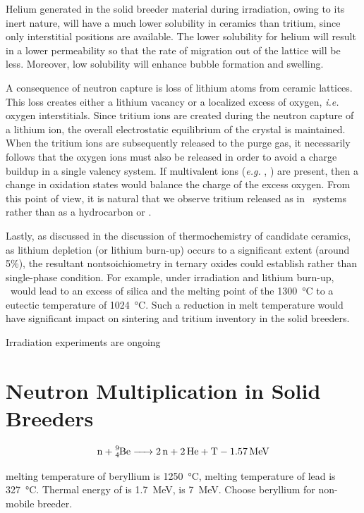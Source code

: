 \documentclass[11pt]{report} %
\newcommand{\lis}{\ce{Li4SiO4}}
\newcommand{\lio}{\ce{Li2O}}
\begin{document}
Helium generated in the solid breeder material during irradiation, owing to its inert nature, will have a much lower solubility in ceramics than tritium, since only interstitial positions are available. The lower solubility for helium will result in a lower permeability so that the rate of migration out of the lattice will be less. Moreover, low solubility will enhance bubble formation and swelling.

A consequence of neutron capture is loss of lithium atoms from ceramic lattices. This loss creates either a lithium vacancy or a localized excess of oxygen, \textit{i.e.} oxygen interstitials. Since tritium ions are created during the neutron capture of a lithium ion, the overall electrostatic equilibrium of the crystal is maintained. When the tritium ions are subsequently released to the purge gas, it necessarily follows that the oxygen ions must also be released in order to avoid a charge buildup in a single valency system. If multivalent ions (\textit{e.g.} , ) are present, then a change in oxidation states would balance the charge of the excess oxygen. From this point of view, it is natural that we observe tritium released as  in \lio~systems rather than as a hydrocarbon or .\cite{Johnson1981}

Lastly, as discussed in the discussion of thermochemistry of candidate ceramics, as lithium depletion (or lithium burn-up) occurs to a significant extent (around 5\%), the resultant nontsoichiometry in ternary oxides could establish rather than single-phase condition. For example, under irradiation and lithium burn-up, \lis~would lead to an excess of silica and the melting point of the \SI{1300}{\celsius} to a eutectic temperature of \SI{1024}{\celsius}. Such a reduction in melt temperature would have significant impact on sintering and tritium inventory in the solid breeders.\cite{Johnson1981}

Irradiation experiments are ongoing 
\cite{vanderLaan200099}

\section{Neutron Multiplication in Solid Breeders}
\begin{align}
\ce{n + ^9_4Be -> 2n + 2He + T}-\SI{1.57}{\mega\electronvolt}\label{eq:Be-n}
\end{align}

melting temperature of beryllium is \SI{1250}{\celsius}, melting temperature of lead is \SI{327}{\celsius}. Thermal energy of  is \SI{1.7}{\mega\electronvolt},  is \SI{7}{\mega\electronvolt}. Choose beryllium for non-mobile breeder.
\end{document}

